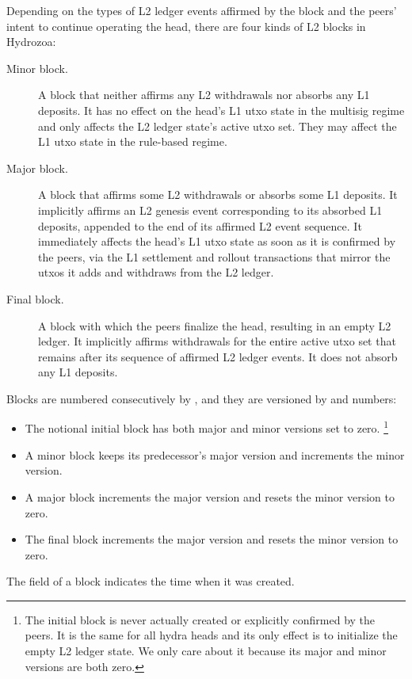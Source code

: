 \documentclass[../hydrozoa.tex]{subfiles}
\begin{document}
Depending on the types of L2 ledger events affirmed by the block and the peers' intent to continue operating the head, there are four kinds of L2 blocks in Hydrozoa:
\begin{description}
  \item[Minor block.] A block that neither affirms any L2 withdrawals nor absorbs any L1 deposits.
    It has no effect on the head's L1 utxo state in the multisig regime and only affects the L2 ledger state's active utxo set.
    They may affect the L1 utxo state in the rule-based regime.
  \item[Major block.] A block that affirms some L2 withdrawals or absorbs some L1 deposits.
    It implicitly affirms an L2 genesis event corresponding to its absorbed L1 deposits, appended to the end of its affirmed L2 event sequence.
    It immediately affects the head's L1 utxo state as soon as it is confirmed by the peers, via the L1 settlement and rollout transactions that mirror the utxos it adds and withdraws from the L2 ledger.
  \item[Final block.] A block with which the peers finalize the head, resulting in an empty L2 ledger.
    It implicitly affirms withdrawals for the entire active utxo set that remains after its sequence of affirmed L2 ledger events.
    It does not absorb any L1 deposits.
\end{description}

Blocks are numbered consecutively by , and they are versioned by  and  numbers:
\begin{itemize}
  \item The notional initial block has both major and minor versions set to zero.%
    \footnote{The initial block is never actually created or explicitly confirmed by the peers.
      It is the same for all hydra heads and its only effect is to initialize the empty L2 ledger state.
      We only care about it because its major and minor versions are both zero.}
  \item A minor block keeps its predecessor's major version and increments the minor version.
  \item A major block increments the major version and resets the minor version to zero.
  \item The final block increments the major version and resets the minor version to zero.
\end{itemize}

The  field of a block indicates the time when it was created.
\end{document}
